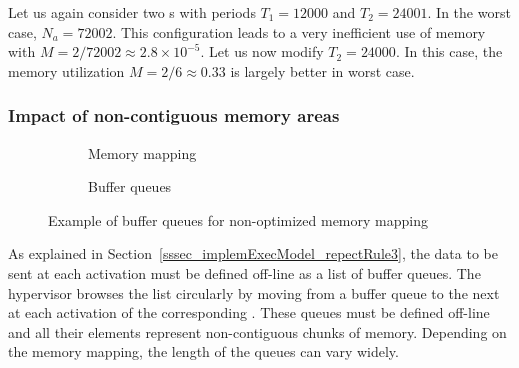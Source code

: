 \documentclass[main.tex]{subfiles}
\begin{document}
\begin{example}
    Let us again consider two \PC{}s with periods $T_1 = 12000$ and $T_2 = 24001$. In the worst case, $N_a = 72002$. This configuration leads to a very inefficient use of memory with $M = 2/72002 \approx 2.8 \times 10^{-5}$. Let us now modify $T_2 = 24000$. In this case, the memory utilization $M = 2/6 \approx 0.33$ is largely better in worst case.
\end{example}

\subsubsection{Impact of non-contiguous memory areas}

\begin{figure}
    \centering
    \begin{subfigure}[b]{0.3\linewidth}
        \centering
        \scalebox{0.7}{}
        \caption{Memory mapping}
        \label{fig_implemExecModel_nonContigBuffers}
    \end{subfigure}\hspace{6mm}
    \begin{subfigure}[b]{0.65\linewidth}
        \centering
        \scalebox{0.7}{}
        \caption{Buffer queues}
        \label{fig_implemExecModel_nonContigBuffersQueues}
    \end{subfigure}
    \caption{Example of buffer queues for non-optimized memory mapping}
    \label{fig_implemExecModel_exNonContigBuffers}
\end{figure}

As explained in Section~\ref{sssec_implemExecModel_repectRule3}, the data to be sent at each \PC{} activation must be defined off-line as a list of buffer queues. The hypervisor browses the list circularly by moving from a buffer queue to the next at each activation of the corresponding \PC{}. These queues must be defined off-line and all their elements represent non-contiguous chunks of memory. Depending on the memory mapping, the length of the queues can vary widely.
\end{document}
